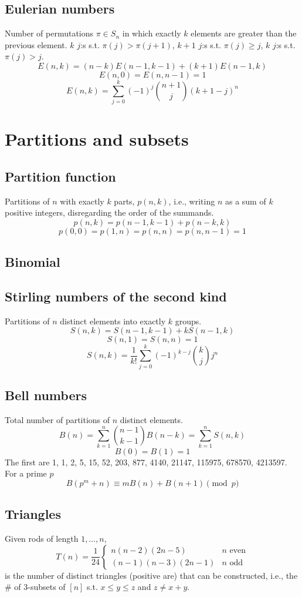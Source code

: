 		\subsection{Eulerian numbers}
			Number of permutations $\pi \in S_n$ in which exactly $k$ elements are greater than the previous element. $k$ $j$:s s.t. $\pi(j)>\pi(j+1)$, $k+1$ $j$:s s.t. $\pi(j)\geq j$, $k$ $j$:s s.t. $\pi(j)>j$.
			$$E(n,k) = (n-k)E(n-1,k-1) + (k+1)E(n-1,k)$$
			$$E(n,0) = E(n,n-1) = 1$$
			$$E(n,k) = \sum_{j=0}^k(-1)^j\binom{n+1}{j}(k+1-j)^n$$
	
	\section{Partitions and subsets}
		\subsection{Partition function}
			Partitions of $n$ with exactly $k$ parts, $p(n,k)$, i.e., writing $n$ as a sum of $k$ positive integers, disregarding the order of the summands.
			$$p(n,k) = p(n-1,k-1)+p(n-k,k)$$
			$$p(0,0)=p(1,n)=p(n,n)=p(n,n-1)=1$$
			
		\subsection{Binomial}

		\subsection{Stirling numbers of the second kind}
			Partitions of $n$ distinct elements into exactly $k$ groups.
			$$S(n,k) = S(n-1,k-1) + k S(n-1,k)$$
			$$S(n,1) = S(n,n) = 1$$
			$$S(n,k) = \frac{1}{k!}\sum_{j=0}^k (-1)^{k-j}\binom{k}{j}j^n$$

		\subsection{Bell numbers}
			Total number of partitions of $n$ distinct elements.
			$$B(n) = \sum_{k=1}^n \binom{n-1}{k-1}B(n-k) = \sum_{k=1}^n S(n,k)$$
			$$B(0) = B(1) = 1$$
			The first are 1, 1, 2, 5, 15, 52, 203, 877, 4140, 21147, 115975, 678570, 4213597.
			For a prime $p$
			$$B(p^m+n)\equiv mB(n)+B(n+1) \pmod{p}$$

		\subsection{Triangles}
			Given rods of length $1,\ldots,n$,
			$$T(n) = \frac{1}{24} \left\{\begin{array}{ll}n(n-2)(2n-5) & n \text{ even}\\(n-1)(n-3)(2n-1) & n \text{ odd}\end{array}\right.$$
			is the number of distinct triangles (positive are) that can be constructed, i.e., the \# of 3-subsets of $[n]$ s.t. $x\leq y\leq z$ and $z\neq x+y$.

